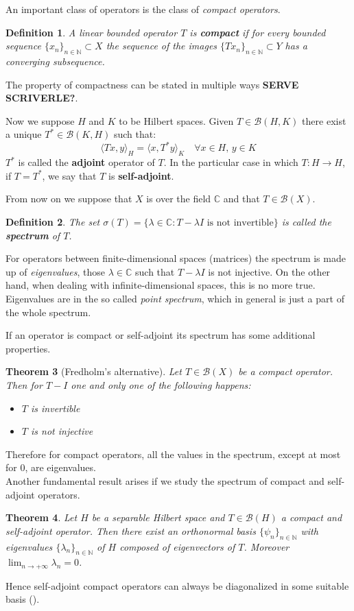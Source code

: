 \documentclass[corpo=11pt, stile=classica, tipotesi=custom,
greek, evenboxes, english]{toptesi}
\numberwithin{equation}{chapter}
\newtheorem{teo}{Theorem}[chapter] %
\newtheorem{defi}[teo]{Definition}
\theoremstyle{remark}
\newcommand{\N}{\mathbb{N}} %
\newcommand{\C}{\mathbb{C}} %
\newcommand{\B}{\mathscr{B}} %
\begin{document}
An important class of operators is the class of \emph{compact operators}.
\begin{defi}\label{compact operator}
	A linear bounded operator $T$ is \textbf{compact} if for every bounded sequence $\{x_n\}_{n \in \N} \subset X$ the sequence of the images $\{Tx_n\}_{n \in \N} \subset Y$ has a converging subsequence.
\end{defi}
The property of compactness can be stated in multiple ways \textbf{SERVE SCRIVERLE?}.

Now we suppose $H$ and $K$ to be Hilbert spaces. Given $T \in \B(H,K)$ there exist a unique $T^* \in \B(K,H)$ such that:
\begin{equation*}
	\langle Tx, y \rangle_H = \langle x, T^* y \rangle_K \quad \forall x \in H,\,y \in K
\end{equation*}
$T^*$ is called the \textbf{adjoint} operator of $T$. In the particular case in which $T : H \rightarrow H$, if $T=T^*$, we say that $T$ is \textbf{self-adjoint}.

From now on we suppose that $X$ is over the field $\C$ and that $T \in \B(X)$.
\begin{defi}\label{spectrum def}
	The set $\sigma(T) = \{\lambda \in \C : T - \lambda I \text{ is not invertible}\}$ is called  the \textbf{spectrum} of $T$.
\end{defi}
For operators between finite-dimensional spaces (matrices) the spectrum is made up of \emph{eigenvalues}, those $\lambda \in \C$ such that $T-\lambda I$ is not injective. On the other hand, when dealing with infinite-dimensional spaces, this is no more true. Eigenvalues are in the so called \emph{point spectrum}, which in general is just a part of the whole spectrum.

If an operator is compact or self-adjoint its spectrum has some additional properties.
\begin{teo}[Fredholm's alternative]\label{Fredholm alternative}
	Let $T \in \B(X)$ be a compact operator. Then for $T-I$ one and only one of the following happens:
	\begin{itemize}
		\item $T$ is invertible
		\item $T$ is not injective
	\end{itemize}
\end{teo}
Therefore for compact operators, all the values in the spectrum, except at most for 0, are eigenvalues.\\
Another fundamental result arises if we study the spectrum of compact and self-adjoint operators.
\begin{teo}\label{self-adjoint compact operators are diagonalizable}
	Let $H$ be a separable Hilbert space and $T \in \B(H)$ a compact and self-adjoint operator. Then there exist an orthonormal basis $\{\psi_n\}_{n \in \N}$ with eigenvalues $\{\lambda_n\}_{n \in \N}$ of $H$ composed of eigenvectors of $T$. Moreover $\lim_{n \rightarrow +\infty} \lambda_n = 0$.
\end{teo}
Hence self-adjoint compact operators can always be diagonalized in some suitable basis (\cite{brezis}). 
\end{document}
